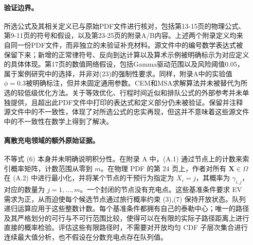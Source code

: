 \documentclass{article}
\begin{document}
\paragraph{验证边界。}
所选公式及其相关定义已与原始PDF文件进行核对，包括第13-15页的物理公式、第9-11页的符号和假设，以及第23-25页的附录A/B内容。上述两个附录定义均来自同一份PDF文件，而非独立的未验证补充材料。源文件中的编号数学表达式被保留下来；新增的正常律符号、反向到达计算以及算术示例被明确标示为对应定义的具体体现。第17页的数值网络假设，包括Gamma驱动范围以及风险阈值$0.05$，属于案例研究中的选择，并非对(23)的强制性要求。同样，附录A中的实验值$\phi=0.3$被明确标注，但并未固定通用参数。CEM和MSA求解算法并未被替代为所选的较低级优化方法。关于等效优化、行程时间近似和排队公式的外部参考并未单独提供，且超出此PDF文件中打印的表达式和定义部分仍未被验证。保留并注释源文件中的不一致性，体现了对所选公式的忠实再现，但这并不意味着这些源文件中的不一致性在数学上得到了解决。


\paragraph{离散充电领域的额外原始证据。}
不等式 (6) 本身并未明确说明积分性。在附录 A 中，(A.1) 通过节点上的计数来索引概率矩阵，计数范围从零到 \(m\)。在物理 PDF 的第 24 页上，作者对所有 \(\mathbf X\in\Omega\) 在 (A.2) 中进行最小化，并将某个节点的干预行为指定为 \(X_i=j\)，其概率为 \(\gamma_{i,j}\)，对应的数量为 \(j=1,\ldots,m\)。一个封闭的节点没有充电点。这些基准条件要求 EV 需求为正，从而迫使每个候选节点通过旅行概率约束 (3),(7) 保持开放状态。队列递归运算应用于这些整数计数。每个基准条件都拥有自己的泰勒中心；唯一的路径及其严格划分的可行与不可行范围比较，使得可以在有限的实际子路径距离上进行直接的概率检验。评估这些有限路径时，不需要对开放均匀 CDF 子层次集合进行连续最大值分析，也不假设在分数充电点存在队列值。
\end{document}
